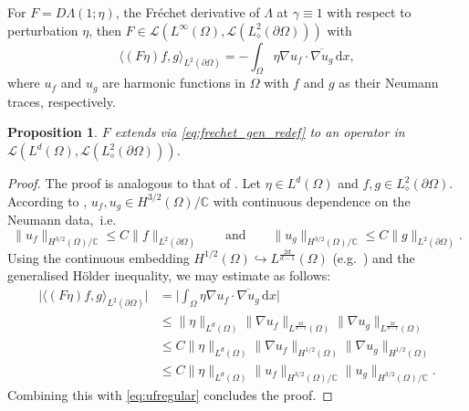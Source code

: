 \documentclass[reqno]{amsart}
\numberwithin{equation}{section}
\numberwithin{figure}{section}
\numberwithin{table}{section}
\theoremstyle{plain}
\newtheorem{proposition}[theorem]{Proposition}
\theoremstyle{definition}
\theoremstyle{remark}
\newcommand{\norm}[1]{\lVert#1\rVert}
\newcommand{\abs}[1]{\lvert#1\rvert}
\newcommand{\inner}[1]{\langle#1\rangle}
\newcommand{\di}{\mathrm{d}}   %
\newcommand{\C}{\mathbb{C}}
\begin{document}
For $F = D \Lambda(1; \eta)$, the Fr\'echet derivative of $\Lambda$ at $\gamma \equiv 1$ with respect to perturbation $\eta$, then $F\in \mathscr{L}(L^\infty(\Omega), \mathscr{L}(L^2_\diamond(\partial\Omega)))$ with
%
\begin{equation} \label{eq:frechet_gen_redef}
    \inner{(F \eta) f, g}_{L^2(\partial\Omega)} = -\int_\Omega \eta \nabla u_f \cdot \overline{\nabla u_g} \,\di x,
\end{equation}
%
where $u_f$ and $u_g$ are harmonic functions in $\Omega$ with $f$ and $g$ as their Neumann traces, respectively. 
%
\begin{proposition} \label{prop:Ld}
    $F$ extends via \eqref{eq:frechet_gen_redef} to an operator in $\mathscr{L}(L^d(\Omega), \mathscr{L}(L^2_\diamond(\partial\Omega)))$.
\end{proposition}
%
\begin{proof}
    The proof is analogous to that of \cite[Proposition~1.1]{Garde2024a}. Let $\eta\in L^d(\Omega)$ and $f,g\in L^2_\diamond(\partial\Omega)$. According to \cite[Chapter~2, Remark~7.2]{Lions1972}, $u_f,u_g\in H^{3/2}(\Omega)/\C$ with continuous dependence on the Neumann data,~i.e.
    \begin{equation} \label{eq:ufregular}
        \norm{u_f}_{H^{3/2}(\Omega)/\C} \leq C\norm{f}_{L^2(\partial \Omega)} \qquad \text{and} \qquad \norm{u_g}_{H^{3/2}(\Omega)/\C} \leq C\norm{g}_{L^2(\partial \Omega)}.
    \end{equation}
    Using the continuous embedding $H^{1/2}(\Omega) \hookrightarrow L^{\frac{2d}{d-1}}(\Omega)$ (e.g.~\cite[Corollary~4.53]{Demengel2012}) and the generalised H\"older inequality, we may estimate as follows:
    \begin{align*}
        \abs{\inner{(F\eta)f,g}_{L^2(\partial\Omega)}} &= \bigl|\int_\Omega \eta\nabla u_f\cdot\overline{\nabla u_g}\,\di x\bigr| \\[1mm]
        &\leq \norm{\eta}_{L^d(\Omega)}\norm{\nabla u_f}_{L^{\frac{2d}{d-1}}(\Omega)}\norm{\nabla u_g}_{L^{\frac{2d}{d-1}}(\Omega)} \\[1mm]
		&\leq C \norm{\eta}_{L^d(\Omega)}\norm{\nabla u_f}_{H^{1/2}(\Omega)}\norm{\nabla u_g}_{H^{1/2}(\Omega)} \\[1mm]
		&\leq C \norm{\eta}_{L^d(\Omega)}\norm{u_f}_{H^{3/2}(\Omega)/\mathbb{C}}\norm{u_g}_{H^{3/2}(\Omega)/\mathbb{C}}.
    \end{align*} 
    Combining this with \eqref{eq:ufregular} concludes the proof.
\end{proof}
\end{document}
